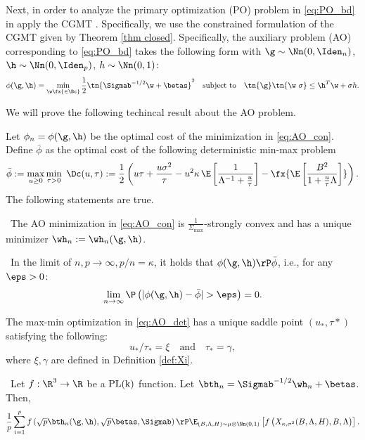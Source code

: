 Next, in order to analyze the primary optimization (PO) problem in \eqref{eq:PO_bd} in apply the CGMT \cite{thrampoulidis2015lasso}. Specifically, we use the constrained formulation of the CGMT given by Theorem \ref{thm closed}.  Specifically, the auxiliary problem (AO) corresponding to \eqref{eq:PO_bd} takes the following form with $\g\sim\Nn(0,\Iden_n)$, $\h\sim\Nn(0,\Iden_p)$, $h\sim \Nn(0,1)$:%
\begin{align}
\phi(\g,\h) = \min_{\w\fx{\in\Bc}} \frac{1}{2}\tn{\Sigmab^{-1/2}\w+\betas}^2\quad\text{subject to}\quad \tn{\g}\tn{\w~{\sigma}}\leq \h^T\w+\sigma h.\label{eq:AO_con}
\end{align}%

We will prove the following techincal result about the AO problem.
\begin{lemma}\label{lem:AO}
Let $\phi_n=\phi(\g,\h)$ be the optimal cost of the minimization in \eqref{eq:AO_con}. Define $\bar\phi$ as the optimal cost of the following deterministic min-max problem
\begin{align}\label{eq:AO_det}
\bar\phi:=\max_{u\geq 0}\min_{\tau>0}~ \Dc(u,\tau):=\frac{1}{2}\left({u\tau} + \frac{u\sigma^2}{\tau} - u^2\kappa\,\E\left[ \frac{1}{\Lambda^{-1}+\frac{u}{\tau}} \right] - \fx{\E\left[\frac{B^2}{1+\frac{u}{\tau}\Lambda}\right]} \right).
\end{align}
The following statements are true.

~The AO minimization in \eqref{eq:AO_con} is $\frac{1}{\Sigma_{\max}}$-strongly convex and has a unique minimizer $\wh_n:=\wh_n(\g,\h)$.

~In the limit of $n,p\rightarrow\infty, p/n=\kappa$, it holds that $\phi(\g,\h)\rP\bar\phi$, i.e., for any $\eps>0$:
$$
\lim_{n\rightarrow\infty}\P\left(|\phi(\g,\h)-\bar\phi|>\eps\right) = 0.
$$

 The max-min optimization in \eqref{eq:AO_det} has a unique saddle point $(u_*,\tau*)$ satisfying the following: 
$$
u_*/\tau_* = \xi\quad\text{and}\quad\tau_* = \gamma,
$$
where $\xi, \gamma$ are defined in Definition \ref{def:Xi}.


~Let $f:\R^3\rightarrow\R$ be a $\rm{PL}({k})$ function. Let $\bth_n=\Sigmab^{-1/2}\wh_n + \betas$. Then,
$$
\frac{1}{p}\sum_{i=1}^{p}f\left(\sqrt{p}\bth_n(\g,\h),\sqrt{p}\betas,\Sigmab\right) \rP \E_{(B,\Lambda,H)\sim\mu\otimes	\Nn(0,1)}\left[f\left(X_{\kappa,\sigma^2}(B,\Lambda,H),B,\Lambda\right) \right].
$$


~



\end{lemma}




